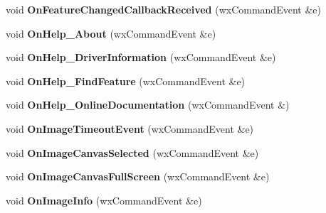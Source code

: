 \begin{DoxyCompactItemize}
\item 
\hypertarget{class_prop_view_frame_ab15667349dfde6edb32c49776dcbfcb1}{void {\bfseries On\+Feature\+Changed\+Callback\+Received} (wx\+Command\+Event \&e)}\label{class_prop_view_frame_ab15667349dfde6edb32c49776dcbfcb1}

\item 
\hypertarget{class_prop_view_frame_ac2558a644fa0259b3e1aa6cf1490398d}{void {\bfseries On\+Help\+\_\+\+About} (wx\+Command\+Event \&e)}\label{class_prop_view_frame_ac2558a644fa0259b3e1aa6cf1490398d}

\item 
\hypertarget{class_prop_view_frame_a8cfc3d9105dc087910241d65aa0f88f7}{void {\bfseries On\+Help\+\_\+\+Driver\+Information} (wx\+Command\+Event \&e)}\label{class_prop_view_frame_a8cfc3d9105dc087910241d65aa0f88f7}

\item 
\hypertarget{class_prop_view_frame_a7eb64b9be51b100762cb744c05b22ceb}{void {\bfseries On\+Help\+\_\+\+Find\+Feature} (wx\+Command\+Event \&e)}\label{class_prop_view_frame_a7eb64b9be51b100762cb744c05b22ceb}

\item 
\hypertarget{class_prop_view_frame_a39236ae1ee310c49be5874e2beca19ed}{void {\bfseries On\+Help\+\_\+\+Online\+Documentation} (wx\+Command\+Event \&)}\label{class_prop_view_frame_a39236ae1ee310c49be5874e2beca19ed}

\item 
\hypertarget{class_prop_view_frame_ab27d1a9ed17c64b60cd2becd6ee04036}{void {\bfseries On\+Image\+Timeout\+Event} (wx\+Command\+Event \&e)}\label{class_prop_view_frame_ab27d1a9ed17c64b60cd2becd6ee04036}

\item 
\hypertarget{class_prop_view_frame_a2a394f9e8de50c8c10ead045a8038f50}{void {\bfseries On\+Image\+Canvas\+Selected} (wx\+Command\+Event \&e)}\label{class_prop_view_frame_a2a394f9e8de50c8c10ead045a8038f50}

\item 
\hypertarget{class_prop_view_frame_ab1cc84dd95d35f1d2959100232d20b04}{void {\bfseries On\+Image\+Canvas\+Full\+Screen} (wx\+Command\+Event \&e)}\label{class_prop_view_frame_ab1cc84dd95d35f1d2959100232d20b04}

\item 
\hypertarget{class_prop_view_frame_a91b3bad078667cfd7780940d6be2d80d}{void {\bfseries On\+Image\+Info} (wx\+Command\+Event \&e)}\label{class_prop_view_frame_a91b3bad078667cfd7780940d6be2d80d}


\end{DoxyCompactItemize}

